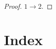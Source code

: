 \documentclass[11pt]{article}
\begin{document}
\begin{proof}
\(1\to2\).
\end{proof}






\section{Index}
\label{sec:org02d09cc}
\renewcommand{\indexname}{}
\printindex
\end{document}
